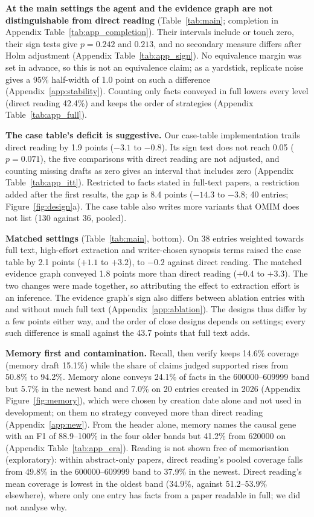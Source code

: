 \documentclass{article} %
\begin{document}
\textbf{At the main settings the agent and the evidence graph are not distinguishable from direct reading} (Table~\ref{tab:main}; completion in Appendix Table~\ref{tab:app_completion}). Their intervals include or touch zero, their sign tests give $p=0.242$ and $0.213$, and no secondary measure differs after Holm adjustment (Appendix Table~\ref{tab:app_sign}). No equivalence margin was set in advance, so this is not an equivalence claim; as a yardstick, replicate noise gives a 95\% half-width of 1.0 point on such a difference (Appendix~\ref{app:stability}). Counting only facts conveyed in full lowers every level (direct reading 42.4\%) and keeps the order of strategies (Appendix Table~\ref{tab:app_full}).

\textbf{The case table's deficit is suggestive.} Our case-table implementation trails direct reading by 1.9 points ($-3.1$ to $-0.8$). Its sign test does not reach 0.05 ($p=0.071$), the five comparisons with direct reading are not adjusted, and counting missing drafts as zero gives an interval that includes zero (Appendix Table~\ref{tab:app_itt}). Restricted to facts stated in full-text papers, a restriction added after the first results, the gap is 8.4 points ($-14.3$ to $-3.8$; 40 entries; Figure~\ref{fig:design}a). The case table also writes more variants that OMIM does not list (130 against 36, pooled).

\textbf{Matched settings} (Table~\ref{tab:main}, bottom). On 38 entries weighted towards full text, high-effort extraction and writer-chosen synopsis terms raised the case table by 2.1 points ($+1.1$ to $+3.2$), to $-0.2$ against direct reading. The matched evidence graph conveyed 1.8 points more than direct reading ($+0.4$ to $+3.3$). The two changes were made together, so attributing the effect to extraction effort is an inference. The evidence graph's sign also differs between ablation entries with and without much full text (Appendix~\ref{app:ablation}). The designs thus differ by a few points either way, and the order of close designs depends on settings; every such difference is small against the 43.7 points that full text adds.

\textbf{Memory first and contamination.} Recall, then verify keeps 14.6\% coverage (memory draft 15.1\%) while the share of claims judged supported rises from 50.8\% to 94.2\%. Memory alone conveys 24.1\% of facts in the 600000--609999 band but 5.7\% in the newest band and 7.0\% on 20 entries created in 2026 (Appendix Figure~\ref{fig:memory}), which were chosen by creation date alone and not used in development; on them no strategy conveyed more than direct reading (Appendix~\ref{app:new}). From the header alone, memory names the causal gene with an F1 of 88.9--100\% in the four older bands but 41.2\% from 620000 on (Appendix Table~\ref{tab:app_era}). Reading is not shown free of memorisation (exploratory): within abstract-only papers, direct reading's pooled coverage falls from 49.8\% in the 600000--609999 band to 37.9\% in the newest. Direct reading's mean coverage is lowest in the oldest band (34.9\%, against 51.2--53.9\% elsewhere), where only one entry has facts from a paper readable in full; we did not analyse why.
\end{document}
